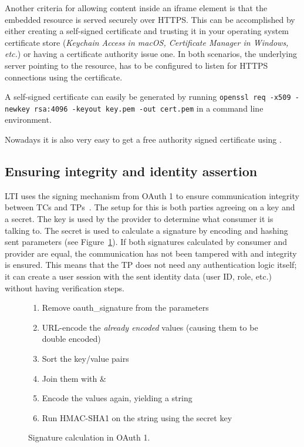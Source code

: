 Another criteria for allowing content inside an iframe element is that the embedded resource is served securely over HTTPS. This can be accomplished by either creating a self-signed certificate and trusting it in your operating system certificate store (\emph{Keychain Access in macOS, Certificate Manager in Windows, etc.}) or having a certificate authority issue one. In both scenarios, the underlying server pointing to the resource, has to be configured to listen for HTTPS connections using the certificate.

A self-signed certificate can easily be generated by running \texttt{openssl req -x509 -newkey rsa:4096 -keyout key.pem -out cert.pem} in a command line environment.

Nowadays it is also very easy to get a free authority signed certificate using \cite{2019LetsEncrypt}.

\label{ensuring_integrity}
\subsection{Ensuring integrity and identity assertion}
LTI uses the signing mechanism from OAuth 1 to ensure communication integrity between TCs and TPs~\citep{2010OAuth1, 2019IsRequest}. The setup for this is both parties agreeing on a key and a secret. The key is used by the provider to determine what consumer it is talking to. The secret is used to calculate a signature by encoding and hashing sent parameters (see Figure~\ref{fig:oauth_signature_calculation}). If both signatures calculated by consumer and provider are equal, the communication has not been tampered with and integrity is ensured.
This means that the TP does not need any authentication logic itself; it can create a user session with the sent identity data (user ID, role, etc.) without having verification steps.

\begin{figure}[h]
\begin{enumerate}[itemsep=0pt,topsep=0pt]
    \item Remove oauth\_signature from the parameters
    \item URL-encode the \textit{already encoded} values (causing them to be double encoded)
    \item Sort the key/value pairs
    \item Join them with \&
    \item Encode the values again, yielding a string
    \item Run HMAC-SHA1 on the string using the secret key
\end{enumerate}
\caption{Signature calculation in OAuth 1.}
\label{fig:oauth_signature_calculation}
\end{figure}

